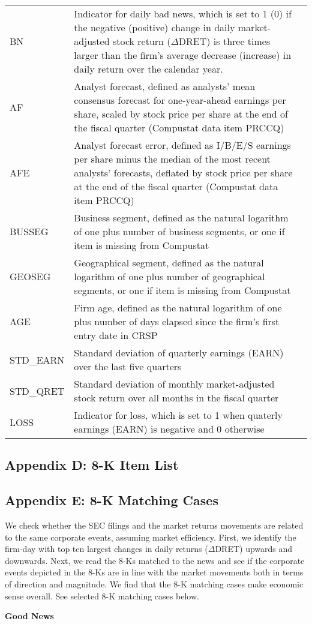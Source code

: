 \begin{table}[H]
\begin{tabular}{lp{15cm}p{15cm}}
		BN & Indicator for daily bad news, which is set to 1 (0) if the negative (positive) change in daily market-adjusted stock return ($\Delta$DRET) is three times larger than the firm’s average decrease (increase) in daily return over the calendar year.\\
		AF & Analyst forecast, defined as analysts' mean consensus forecast for one-year-ahead earnings per share, scaled by stock price per share at the end of the fiscal quarter (Compustat data item PRCCQ)\\
		AFE & Analyst forecast error, defined as I/B/E/S earnings per share minus the median of the most recent analysts' forecasts, deflated by stock price per share at the end of the fiscal quarter (Compustat data item PRCCQ)\\
		BUSSEG & Business segment, defined as the natural logarithm of one plus number of business segments, or one if item is missing from Compustat\\
		GEOSEG & Geographical segment, defined as the natural logarithm of one plus number of geographical segments, or one if item is missing from Compustat\\
		AGE & Firm age, defined as the natural logarithm of one plus number of days elapsed since the firm's first entry date in CRSP\\
		STD\_EARN & Standard deviation of quarterly earnings (EARN) over the last five quarters\\
		STD\_QRET & Standard deviation of monthly market-adjusted stock return over all months in the fiscal quarter\\
		LOSS & Indicator for loss, which is set to 1 when quaterly earnings (EARN) is negative and 0 otherwise\\
	\end{tabular}%
\end{table}%
\newpage
\subsection*{Appendix D: 8-K Item List}
\label{appd}

\newpage
\subsection*{Appendix E: 8-K Matching Cases}
We check whether the SEC filings and the market returns movements are related to the same corporate events, assuming market efficiency. First, we identify the firm-day with top ten largest changes in daily returns ($\Delta$DRET) upwards and downwards. Next, we read the 8-Ks matched to the news and see if the corporate events depicted in the 8-Ks are in line with the market movements both in terms of direction and magnitude. We find that the 8-K matching cases make economic sense overall. See selected 8-K matching cases below.
\label{appe}
\begin{center}
	\textbf{Good News}
\end{center}
